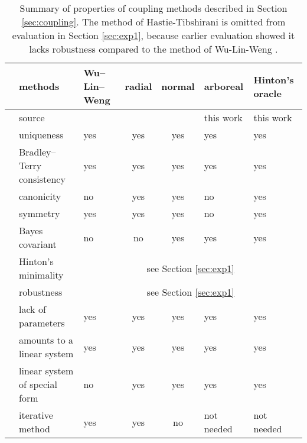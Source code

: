 \begin{table}[!ht]
	\begin{tabular}{cm{2.5cm}|m{1.5cm}ccm{1.5cm}|m{1.5cm}}
		\hline 
		&methods %
			& Wu--Lin--Weng & radial & normal & arboreal & Hinton's oracle \\
		\hline 
		&source %
			& \cite{wu2004probability} & \cite{vsuch2015new} & \cite{vsuch2016bayes} & this work & this work \\
		\multirow{5}{*}{\begin{turn}{90}\makecell{exact}\end{turn}}
		&uniqueness %
			& yes & yes & yes & yes & yes \\
		&Bradley--Terry consistency %
			& yes & yes & yes & yes & yes \\
		&canonicity %
			& no & yes & yes & no & yes \\
		&symmetry %
			& yes & yes & yes & no & yes \\
		& Bayes covariant %
			& no & no & yes & yes & yes \\
		\hline
		\multirow{5}{*}{\begin{turn}{90}\makecell{non-exact}\end{turn}}
		&Hinton's minimality %
			& \multicolumn{5}{c}{see Section \ref{sec:exp1}} \\
		&robustness %
			& \multicolumn{5}{c}{see Section \ref{sec:exp1}} \\
		&lack of parameters %
			& yes & yes & yes & yes & yes \\
		& amounts to a linear system %
			& yes & yes & yes & yes & yes\\
		& linear system of special form %
			& no & yes & yes & yes & yes \\
		& iterative method %
			& yes & yes & no & not needed & not needed\\
		\hline
	\end{tabular}
	\caption{Summary of properties of coupling methods described in Section \ref{sec:coupling}. The method of Hastie-Tibshirani is omitted from evaluation in Section \ref{sec:exp1}, because earlier evaluation showed it lacks robustness compared to the method of Wu-Lin-Weng \cite{wu2004probability}.}
	\label{tab:summaryCoupling}
\end{table}


